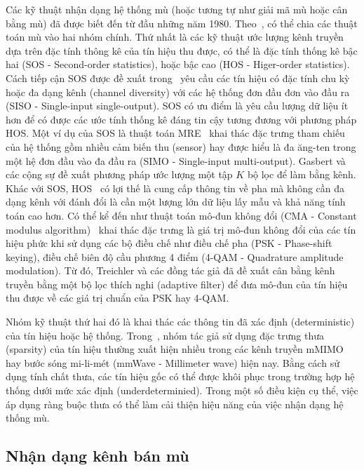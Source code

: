Các kỹ thuật nhận dạng hệ thống mù (hoặc tương tự như giải mã mù hoặc cân bằng mù) đã được biết đến từ đầu những năm 1980. Theo~\cite{vilas2022}, có thể chia các thuật toán mù vào hai nhóm chính. Thứ nhất là các kỹ thuật ước lượng kênh truyền dựa trên đặc tính thông kê của tín hiệu thu được, có thể là đặc tính thống kê bậc hai (SOS - Second-order statistics), hoặc bậc cao (HOS - Higer-order statistics). Cách tiếp cận SOS được đề xuất trong~\cite{Tong1994} yêu cầu các tín hiệu có đặc tính chu kỳ hoặc đa dạng kênh (channel diversity) với các hệ thống đơn đầu đơn vào đầu ra (SISO - Single-input single-output). SOS có ưu điểm là yêu cầu lượng dữ liệu ít hơn để có được các ước tính thống kê đáng tin cậy tương đương với phương pháp HOS. Một ví dụ của SOS là thuật toán MRE~\cite{original} khai thác đặc trưng tham chiếu của hệ thống gồm nhiều cảm biến thu (sensor) hay được hiểu là đa ăng-ten trong một hệ đơn đầu vào đa đầu ra (SIMO - Single-input multi-output). Gasbert và các cộng sự đề xuất phương pháp ước lượng một tập $K$ bộ lọc để làm bằng kênh.
Khác với SOS, HOS~\cite{Giannakis1997} có lợi thế là cung cấp thông tin về pha mà không cần đa dạng kênh với đánh đổi là cần một lượng lớn dữ liệu lấy mẫu và khả năng tính toán cao hơn. Có thể kể đến như thuật toán mô-đun không đổi (CMA - Constant modulus algorithm)~\cite{Treichler1983} khai thác đặc trưng là giá trị mô-đun không đổi của các tín hiệu phức khi sử dụng các bộ điều chế như điều chế pha (PSK - Phase-shift keying), điều chế biên độ cầu phương 4 điểm (4-QAM - Quadrature amplitude modulation). Từ đó, Treichler và các đồng tác giả đã đề xuất cân bằng kênh truyền bằng một bộ lọc thích nghi (adaptive filter) để đưa mô-đun của tín hiệu thu được về các giá trị chuẩn của PSK hay 4-QAM.

Nhóm kỹ thuật thứ hai đó là khai thác các thông tin đã xác định (deterministic) của tín hiệu hoặc hệ thống. Trong~\cite{Bey2011}, nhóm tác giả sử dụng đặc trưng thưa (sparsity) của tín hiệu thường xuất hiện nhiều trong các kênh truyền mMIMO hay bước sóng mi-li-mét (mmWave - Millimeter wave) hiện nay. Bằng cách sử dụng tính chất thưa, các tín hiệu gốc có thể được khôi phục trong trường hợp hệ thống dưới mức xác định (underdeterminied). Trong một số điều kiện cụ thể, việc áp dụng ràng buộc thưa có thể làm cải thiện hiệu năng của việc nhận dạng hệ thống mù.

\subsection{Nhận dạng kênh bán mù} \label{sec:semi}

